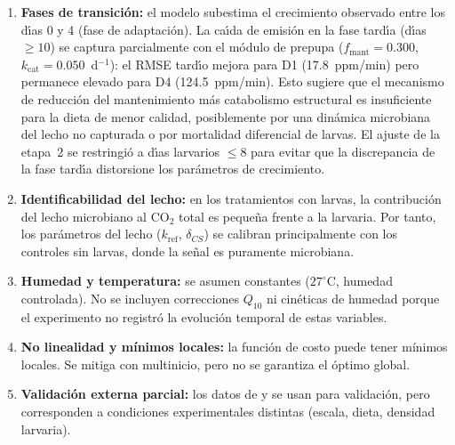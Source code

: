 \begin{enumerate}
  \item \textbf{Fases de transici\'{o}n:} el modelo subestima el crecimiento observado entre los d\'{\i}as 0 y 4 (fase de adaptaci\'{o}n). La ca\'{\i}da de emisi\'{o}n en la fase tard\'{\i}a (d\'{\i}as $\geq 10$) se captura parcialmente con el m\'{o}dulo de prepupa ($f_{\mathrm{mant}} = 0.300$, $k_{\mathrm{cat}} = 0.050$~d$^{-1}$): el RMSE tard\'{\i}o mejora para D1 (17.8~ppm/min) pero permanece elevado para D4 (124.5~ppm/min). Esto sugiere que el mecanismo de reducci\'{o}n del mantenimiento m\'{a}s catabolismo estructural es insuficiente para la dieta de menor calidad, posiblemente por una din\'{a}mica microbiana del lecho no capturada o por mortalidad diferencial de larvas. El ajuste de la etapa~2 se restringi\'{o} a d\'{\i}as larvarios $\leq 8$ para evitar que la discrepancia de la fase tard\'{\i}a distorsione los par\'{a}metros de crecimiento.
  
  \item \textbf{Identificabilidad del lecho:} en los tratamientos con larvas, la contribución del lecho microbiano al CO$_2$ total es pequeña frente a la larvaria. Por tanto, los parámetros del lecho ($k_{\mathrm{ref}}$, $\delta_{CS}$) se calibran principalmente con los controles sin larvas, donde la señal es puramente microbiana.
  
  \item \textbf{Humedad y temperatura:} se asumen constantes ($27^\circ$C, humedad controlada). No se incluyen correcciones $Q_{10}$ ni cinéticas de humedad porque el experimento no registró la evolución temporal de estas variables.
  
  \item \textbf{No linealidad y mínimos locales:} la función de costo puede tener mínimos locales. Se mitiga con multinicio, pero no se garantiza el óptimo global.
  
  \item \textbf{Validaci\'{o}n externa parcial:} los datos de \textcite{ermolaevGreenhouseGasEmissions2019} y \textcite{schonUsingGasExchange2026} se usan para validaci\'{o}n, pero corresponden a condiciones experimentales distintas (escala, dieta, densidad larvaria).
\end{enumerate}